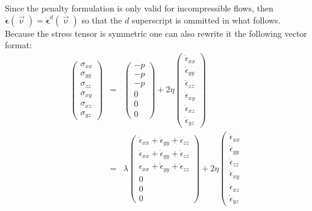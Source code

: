 Since the penalty formulation is only valid for incompressible flows, then 
$\dot{\bm \epsilon}(\vec\upnu)=\dot{\bm \epsilon}^d(\vec\upnu)$ so that 
the $d$ superscript is ommitted in what follows.
Because the stress tensor is symmetric one can also rewrite it the following vector format:
\begin{eqnarray}
\left(
\begin{array}{c}
\sigma_{xx}\\
\sigma_{yy}\\
\sigma_{zz}\\
\sigma_{xy}\\
\sigma_{xz}\\
\sigma_{yz}
\end{array}
\right)
&=&
\left(
\begin{array}{c}
-p\\
-p\\
-p\\
0\\
0\\
0
\end{array}
\right)
+2 \eta
\left(
\begin{array}{c}
\dot{\epsilon}_{xx}\\
\dot{\epsilon}_{yy}\\
\dot{\epsilon}_{zz}\\
\dot{\epsilon}_{xy}\\
\dot{\epsilon}_{xz}\\
\dot{\epsilon}_{yz}
\end{array}
\right)
\nonumber\\
&=&
\lambda
\left(
\begin{array}{c}
\dot{\epsilon}_{xx} + \dot{\epsilon}_{yy} + \dot{\epsilon}_{zz}\\
\dot{\epsilon}_{xx} + \dot{\epsilon}_{yy} + \dot{\epsilon}_{zz}\\
\dot{\epsilon}_{xx} + \dot{\epsilon}_{yy} + \dot{\epsilon}_{zz}\\
0 \\ 0 \\ 0
\end{array}
\right)
+2 \eta
\left(
\begin{array}{c}
\dot{\epsilon}_{xx}\\
\dot{\epsilon}_{yy}\\
\dot{\epsilon}_{zz}\\
\dot{\epsilon}_{xy}\\
\dot{\epsilon}_{xz}\\
\dot{\epsilon}_{yz}
\end{array}

\end{eqnarray}
